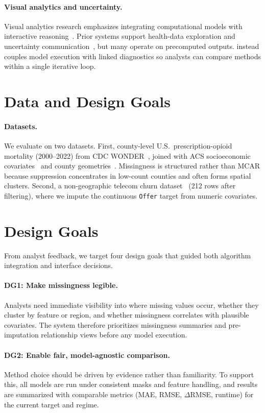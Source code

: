 \paragraph*{Visual analytics and uncertainty.}
Visual analytics research emphasizes integrating computational models with interactive reasoning~\cite{Endert2017}. Prior systems support health-data exploration and uncertainty communication~\cite{sankaran2016opioid,Carroll2014HealthVis,Sacha2016UncertaintyTrust}, but many operate on precomputed outputs. \tool instead couples model execution with linked diagnostics so analysts can compare methods within a single iterative loop.

\section{Data and Design Goals}
\paragraph*{Datasets.}
We evaluate on two datasets. First, county-level U.S.\ prescription-opioid mortality (2000--2022) from CDC WONDER~\cite{cdcWonderDrugPoisoning}, joined with ACS socioeconomic covariates~\cite{acsPopulation} and county geometries~\cite{tigerShapefiles}. Missingness is structured rather than MCAR because suppression concentrates in low-count counties and often forms spatial clusters. Second, a non-geographic telecom churn dataset~\cite{telcoHF} (212 rows after filtering), where we impute the continuous \texttt{Offer} target from numeric covariates.

\section{Design Goals}
From analyst feedback, we target four design goals that guided both algorithm integration and interface decisions.

\paragraph*{DG1: Make missingness legible.}
Analysts need immediate visibility into where missing values occur, whether they cluster by feature or region, and whether missingness correlates with plausible covariates. The system therefore prioritizes missingness summaries and pre-imputation relationship views before any model execution.

\paragraph*{DG2: Enable fair, model-agnostic comparison.}
Method choice should be driven by evidence rather than familiarity. To support this, all models are run under consistent masks and feature handling, and results are summarized with comparable metrics (MAE, RMSE, \(\Delta\)RMSE, runtime) for the current target and regime.


